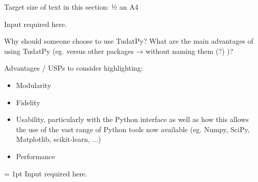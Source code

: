 \lbrack Target size of text in this section: ½ an A4\rbrack

\lbrack Input required here.\rbrack

Why should someone choose to use TudatPy?
What are the main advantages of using TudatPy (eg. versus other packages → without naming them (?) )?

Advantages / USPs to consider highlighting:
\begin{itemize}
    \item Modularity
    \item Fidelity
    \item Usability, particularly with the Python interface as well as how this allows the use of the vast range of Python tools now available (eg. Numpy, SciPy, Matplotlib, scikit-learn, ...)
    \item Performance
\end{itemize}

\fboxrule = 1pt
    \lbrack Input required here.\rbrack

